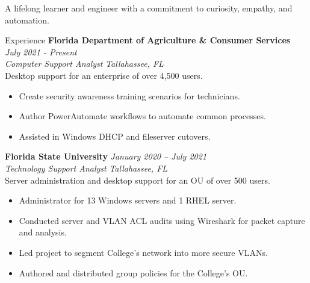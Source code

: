 \documentclass{resume} %
\begin{document}
	\begin{center}{\vspace{-0.1cm}A lifelong learner and engineer with a commitment to curiosity, empathy, and automation.\vspace{-0.1cm}}\end{center}

	
	\begin{rSection}{Experience}
		{\bf Florida Department of Agriculture \& Consumer Services} \hfill {\em July 2021 - Present}\\
		\textit{Computer Support Analyst} \hfill {\em Tallahassee, FL} \\
		Desktop support for an enterprise of over 4,500 users.
		\begin{itemize}
			\vspace{-0.2cm} \item Create security awareness training scenarios for technicians.
			\vspace{-0.2cm} \item Author PowerAutomate workflows to automate common processes.
			\vspace{-0.2cm} \item Assisted in Windows DHCP and fileserver cutovers.
		\end{itemize}
		{\bf Florida State University} \hfill {\em January 2020 – July 2021} \\
		\textit{Technology Support Analyst} \hfill {\em Tallahassee, FL} \smallskip \\
		Server administration and desktop support for an OU of over 500 users.
		\begin{itemize}
			\vspace{-0.2cm} \item Administrator for 13 Windows servers and 1 RHEL server.
			\vspace{-0.2cm} \item Conducted server and VLAN ACL audits using Wireshark for packet capture and analysis.
			\vspace{-0.2cm} \item Led project to segment College's network into more secure VLANs.\vspace{-0.2cm} \item Authored and distributed group policies for the College's OU.

\end{itemize}
\end{rSection}
\end{document}

